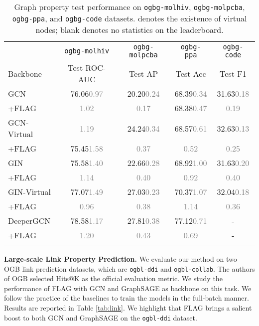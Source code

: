 \documentclass[11pt]{article}
\newcommand{\bftab}{\fontseries{b}\selectfont}
\begin{document}
 \begin{table}[t]
\caption{Graph property test performance on \texttt{ogbg-molhiv},  \texttt{ogbg-molpcba}, \texttt{ogbg-ppa}, and \texttt{ogbg-code} datasets.  denotes the existence of virtual nodes; blank denotes no statistics on the leaderboard.}
\centering
\begin{tabular}{lcccc}
\Xhline{2\arrayrulewidth}
 	& \texttt{ogbg-molhiv} & \texttt{ogbg-molpcba} & \texttt{ogbg-ppa} & \texttt{ogbg-code}   \\
Backbone 	& Test ROC-AUC & Test AP & Test Acc & Test F1 \\
\hline\hline
GCN & 76.06\textcolor{gray}{{0.97}}  & 20.20\textcolor{gray}{ {0.24}}& 68.39\textcolor{gray}{ {0.34}} &  31.63\textcolor{gray}{ {0.18}}\\
+FLAG & \bftab76.83\textcolor{gray}{ {1.02}} & \bftab21.16\textcolor{gray}{ {0.17}}& 68.38\textcolor{gray}{ {0.47}}& \bftab32.09\textcolor{gray}{ {0.19}}\\
\hline
GCN-Virtual& \bftab75.99\textcolor{gray}{ {1.19}} & 24.24\textcolor{gray}{ {0.34}} & 68.57\textcolor{gray}{ {0.61}}&32.63\textcolor{gray}{ {0.13}} \\
+FLAG&75.45\textcolor{gray}{ {1.58}} & \bftab 24.83\textcolor{gray}{ {0.37}}& \bftab69.44\textcolor{gray}{ {0.52}}&\bftab33.16\textcolor{gray}{ {0.25}} \\
\hline
GIN& 75.58\textcolor{gray}{ {1.40}} & 22.66\textcolor{gray}{ {0.28}}&68.92\textcolor{gray}{ {1.00}}&31.63\textcolor{gray}{ {0.20}} \\
+FLAG& \bftab76.54\textcolor{gray}{ {1.14}}&\bftab23.95\textcolor{gray}{ {0.40}}&\bftab69.05\textcolor{gray}{ {0.92}}&\bftab32.41\textcolor{gray}{ {0.40}} \\
\hline
GIN-Virtual& 77.07\textcolor{gray}{ {1.49}}& 27.03\textcolor{gray}{ {0.23}}&70.37\textcolor{gray}{ {1.07}}&32.04\textcolor{gray}{ {0.18}} \\
+FLAG& \bftab77.48\textcolor{gray}{ {0.96}} & \bftab28.34\textcolor{gray}{ {0.38}}&\bftab72.45\textcolor{gray}{ {1.14}}&\bftab32.96\textcolor{gray}{ {0.36}} \\
\hline
DeeperGCN& 78.58\textcolor{gray}{ {1.17}} & 27.81\textcolor{gray}{ {0.38}} & 77.12\textcolor{gray}{ {0.71}}&-\\
+FLAG& \bftab79.42\textcolor{gray}{ {1.20}}&\bftab28.42\textcolor{gray}{ {}0.43}&\bftab77.52\textcolor{gray}{ {0.69}}&-\\
\Xhline{2\arrayrulewidth}

\end{tabular}

\label{tab:graph}
\end{table} 
{\bf Large-scale Link Property Prediction.} We evaluate our method on two OGB link prediction datasets, which are \texttt{ogbl-ddi} and \texttt{ogbl-collab}. The authors of OGB selected Hits@K as the official evaluation metric.  We study the performance of FLAG with GCN and GraphSAGE as backbone on this task. We follow the practice of the baselines to train the models in the full-batch manner. Results are reported in Table \ref{tab:link}. We highlight that FLAG brings a salient boost to both GCN and GraphSAGE on the \texttt{ogbl-ddi} dataset. 
\end{document}
